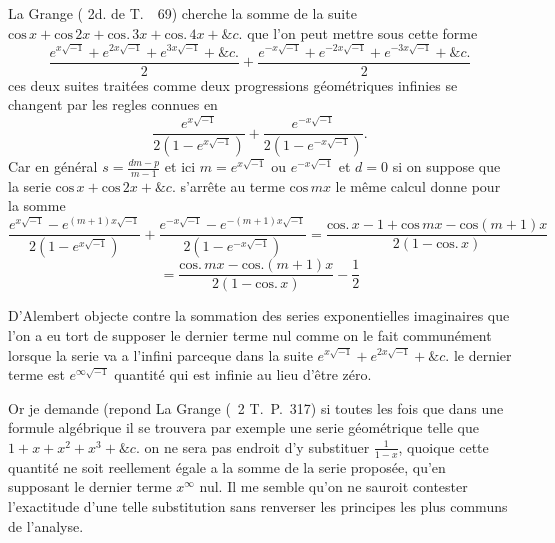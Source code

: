 \documentclass[11pt,a4paper]{article}
\begin{document}

La Grange ( 2d. de T.~~69) cherche la somme de la suite
$\text{cos}\,x+\text{cos}\,2x+\text{cos.}\,3x+\text{cos.}\,4x+\&c.$ que l'on peut mettre sous cette
forme
\[ \frac{e^{x\sqrt{-1}}+e^{2x\sqrt{-1}}+e^{3x\sqrt{-1}}+\&c.}{2}+\frac{e^{-x\sqrt{-1}}+e^{-2x\sqrt{-1}}+e^{-3x\sqrt{-1}}+\&c.}{2} \]
ces deux suites traitées comme deux progressions géométriques infinies
se changent par les regles  connues en
\[ \frac{e^{x\sqrt{-1}}}{2(1-e^{x\sqrt{-1}})}+\frac{e^{-x\sqrt{-1}}}{2(1-e^{-x\sqrt{-1}})}. \]
Car en général $s=\frac{dm-p}{m-1}$ et ici $m=e^{x\sqrt{-1}}$ ou $e^{-x\sqrt{-1}}$ et $d=0$
si on suppose que la serie $\text{cos}\,x+\text{cos}\,2x+\&c.$ s'arrête au terme
$\text{cos}\,mx$ le même calcul donne pour la somme
\[ \frac{e^{x\sqrt{-1}}-e^{(m+1)x\sqrt{-1}}}{2(1-e^{x\sqrt{-1}})}+\frac{e^{-x\sqrt{-1}}-e^{-(m+1)x\sqrt{-1}}}{2(1-e^{-x\sqrt{-1}})}=\frac{\text{cos.}\,x-1+\text{cos}\,mx-\text{cos}(m+1)x}{2(1-\text{cos.}\,x)} \]
\[ =\frac{\text{cos.}\,mx-\text{cos.}(m+1)x}{2(1-\text{cos.}\,x)}-\frac{1}{2} \]

D'Alembert objecte contre la sommation des series exponentielles
imaginaires que l'on a eu tort  de supposer le dernier
terme nul comme on le fait communément lorsque la serie va
a l'infini parceque dans la suite $e^{x\sqrt{-1}}+e^{2x\sqrt{-1}}+\&c.$ le dernier terme
est $e^{\infty\sqrt{-1}}$ quantité qui est infinie au lieu d'être zéro.

Or je demande (repond La Grange (~2 T.~P.~317) si toutes les fois que
dans une formule algébrique il se trouvera par exemple une serie
géométrique telle que $1+x+x^{2}+x^{3}+\&c.$ on ne sera pas endroit
d'y substituer $\frac{1}{1-x}$, quoique cette quantité ne soit reellement égale
a la somme de la serie proposée, qu'en supposant le dernier terme
$x^{\infty}$ nul. Il me semble qu'on ne sauroit contester l'exactitude d'une telle
substitution sans renverser les principes les plus communs de l'analyse.
\end{document}
